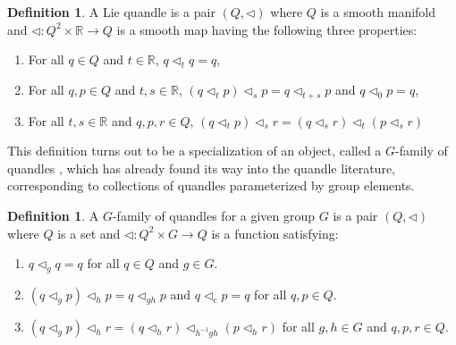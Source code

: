 \documentclass[12pt]{amsart}
\theoremstyle{plain}
\theoremstyle{definition}
\newtheorem{definition}[theorem]{Definition}
\begin{document}
\begin{definition}
     A Lie quandle is a pair $(Q,\triangleleft)$ where $Q$ is a smooth manifold and $\triangleleft:Q^2\times \mathbb{R} \to Q$ is a smooth map having the following three properties:

\begin{enumerate}
    \item 
 For all $q \in Q$ and $ t \in \mathbb{R}$, $q \triangleleft_t q =q,$  

\item 
For all $q,p \in Q$ and $t,s \in \mathbb{R}$, $(q  \triangleleft_t p )\triangleleft_s p = q \triangleleft_{t+s} p $ and $q\triangleleft_0 p = q$,

\item 
For all $ t,s \in \mathbb{R}$  
and $q,p,r \in Q$, $(q\triangleleft_t p) \triangleleft_s r = (q \triangleleft_s r)\triangleleft_{t} ( p\triangleleft_s r) $ 
\end{enumerate}

\end{definition}


\vspace{5mm}

This definition turns out to be a specialization of an object, called a $G$-family of quandles \cite{IIJO}, which has already found its way into the quandle literature, corresponding to collections of quandles parameterized by group elements.

\vspace{5mm}

\begin{definition}
    

A $G$-family of quandles for a given group $G$ is a pair $(Q,\triangleleft)$ where $Q$ is a set and $\triangleleft:Q^2\times G \to Q$ is a function satisfying:
\begin{enumerate}
    \item 
 $q \triangleleft_g q =q$ for all $q \in Q$ and $g \in G$.

\item 
$ (q  \triangleleft_g p )\triangleleft_h p = q \triangleleft_{gh} p $ and $q\triangleleft_e p = q$ for all $q,p \in Q$.

\item 
$ (q\triangleleft_g p) \triangleleft_h r = (q \triangleleft_h r)\triangleleft_{h^{-1}gh} (p\triangleleft_h r) $ for all $g,h \in G$ and $q,p,r \in Q$.
\end{enumerate}
\end{definition}
\end{document}
